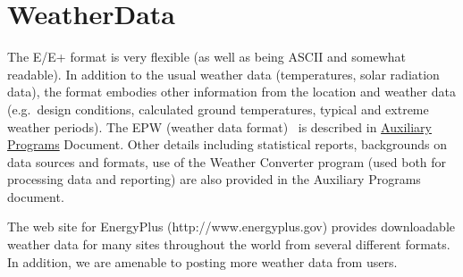 \section{WeatherData}\label{weatherdata}

The E/E+ format is very flexible (as well as being ASCII and somewhat readable). In addition to the usual weather data (temperatures, solar radiation data), the format embodies other information from the location and weather data (e.g.~design conditions, calculated ground temperatures, typical and extreme weather periods). The EPW (weather data format)~ is described in \href{file:///E:/Docs4PDFs/AuxiliaryPrograms.pdf}{Auxiliary Programs} Document. Other details including statistical reports, backgrounds on data sources and formats, use of the Weather Converter program (used both for processing data and reporting) are also provided in the Auxiliary Programs document.

The web site for EnergyPlus (http://www.energyplus.gov) provides downloadable weather data for many sites throughout the world from several different formats. In addition, we are amenable to posting more weather data from users.
